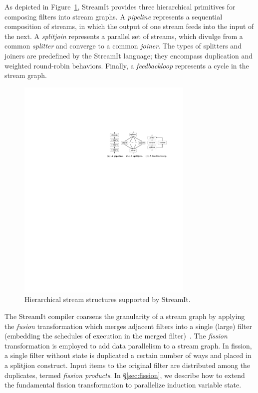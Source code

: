 As depicted in Figure~\ref{fig:structures}, StreamIt provides three
hierarchical primitives for composing filters into stream graphs.  A
{\it pipeline} represents a sequential composition of streams, in
which the output of one stream feeds into the input of the next.  A
{\it splitjoin} represents a parallel set of streams, which divulge
from a common {\it splitter} and converge to a common {\it joiner}.
The types of splitters and joiners are predefined by the StreamIt
language; they encompass duplication and weighted round-robin
behaviors.  Finally, a {\it feedbackloop} represents a cycle in the
stream graph.

\begin{figure}[t!]
\centering
\includegraphics[width=3.3in]{stream-structures.pdf}
\caption{Hierarchical stream structures supported by StreamIt.\protect\label{fig:structures}}
\end{figure}

The StreamIt compiler coarsens the granularity of a stream graph by
applying the {\it fusion} transformation which merges adjacent filters
into a single (large) filter (embedding the schedules of execution in
the merged filter)~\cite{streamit-asplos}.  The {\it fission}
transformation is employed to add data parallelism to a stream graph.
In fission, a single filter without state is duplicated a certain
number of ways and placed in a splitjion construct.  Input items to
the original filter are distributed among the duplicates, termed {\it
  fission products}.  In \S\ref{sec:fission}, we describe how to
extend the fundamental fission transformation to parallelize induction
variable state.
